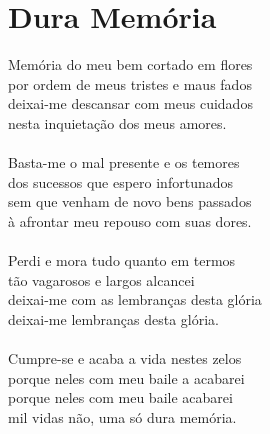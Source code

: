\documentclass{article}
\begin{document}
\section{ Dura Memória}
Memória do meu bem cortado em flores\\
por ordem de meus tristes e maus fados\\
deixai-me descansar com meus cuidados\\
nesta inquietação dos meus amores.\\
\\
Basta-me o mal presente e os temores\\
dos sucessos que espero infortunados\\
sem que venham de novo bens passados\\
à afrontar meu repouso com suas dores.\\
\\
Perdi e mora tudo quanto em termos\\
tão vagarosos e largos alcancei\\
deixai-me com as lembranças desta glória\\
deixai-me lembranças desta glória.\\
\\
Cumpre-se e acaba a vida nestes zelos\\
porque neles com meu baile a acabarei\\
porque neles com meu baile acabarei\\
mil vidas não, uma só dura memória.\\
\end{document}
